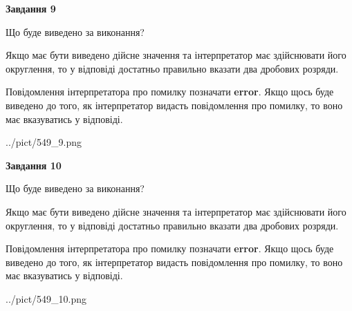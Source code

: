 \documentclass[12pt, ukrainian]{article}
\begin{document}
{\begin {Large}
{\begin {center}\textbf{Завдання 9}\end {center}}\par
Що буде виведено за виконання? \par

Якщо має бути виведено дійсне значення та інтерпретатор має здійснювати його округлення, 
то у відповіді достатньо правильно вказати два дробових розряди.

Повідомлення інтерпретатора про помилку позначати \textbf{error}.
Якщо щось буде виведено до того, як інтерпретатор видасть повідомлення про помилку, 
то воно має вказуватись у відповіді. \par

\begin{center}
	{../pict/549_9.png}
\end{center}
\newpage

{\begin {center}\textbf{Завдання 10}\end {center}}\par
Що буде виведено за виконання? \par

Якщо має бути виведено дійсне значення та інтерпретатор має здійснювати його округлення, 
то у відповіді достатньо правильно вказати два дробових розряди.

Повідомлення інтерпретатора про помилку позначати \textbf{error}.
Якщо щось буде виведено до того, як інтерпретатор видасть повідомлення про помилку, 
то воно має вказуватись у відповіді. \par

\begin{center}
	{../pict/549_10.png}
\end{center}
\newpage

\end {Large}}
\end{document}
